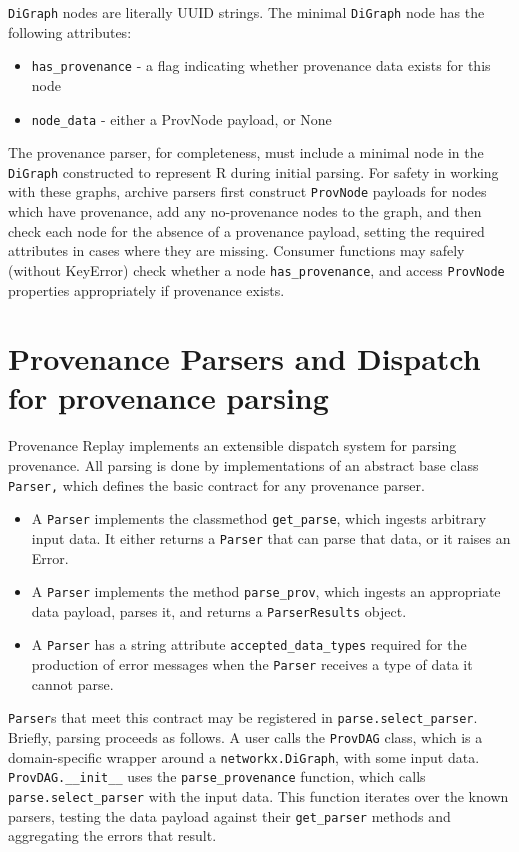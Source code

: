 \texttt{DiGraph} nodes are literally UUID strings. The minimal \texttt{DiGraph} node has the
following attributes:
\begin{itemize}
    \item \texttt{has\_provenance} - a flag indicating whether provenance data exists for this node
    \item \texttt{node\_data} - either a ProvNode payload, or None
\end{itemize}

The provenance parser, for completeness, must include a minimal node in the
\texttt{DiGraph} constructed to represent R during initial parsing. For safety in working
with these graphs, archive parsers first construct \texttt{ProvNode} payloads for nodes
which have provenance, add any no-provenance nodes to the graph, and then check
each node for the absence of a provenance payload, setting the required
attributes in cases where they are missing. Consumer functions may safely
(without KeyError) check whether a node \texttt{has\_provenance}, and access \texttt{ProvNode}
properties appropriately if provenance exists.

\section{Provenance Parsers and Dispatch for provenance parsing}

Provenance Replay implements an extensible dispatch system for parsing
provenance. All parsing is done by implementations of an abstract base class
\texttt{Parser,} which defines the basic contract for any provenance parser. 
\begin{itemize}
    \item A \texttt{Parser} implements the classmethod \texttt{get\_parse},
        which ingests arbitrary input data. It either returns a \texttt{Parser} that
        can parse that data, or it raises an Error.
    \item A \texttt{Parser} implements the method \texttt{parse\_prov}, which
        ingests an appropriate data payload, parses it, and returns a
        \texttt{ParserResults} object.
    \item A \texttt{Parser} has a string attribute
        \texttt{accepted\_data\_types} required for the production of error messages
        when the \texttt{Parser} receives a type of data it cannot parse.
\end{itemize}

\texttt{Parser}s that meet this contract may be registered in \texttt{parse.select\_parser}.
Briefly, parsing proceeds as follows. A user calls the \texttt{ProvDAG} class, which is a
domain-specific wrapper around a \texttt{networkx.DiGraph}, with some input data.
\texttt{ProvDAG.\_\_init\_\_} uses the \texttt{parse\_provenance} function, which calls
\texttt{parse.select\_parser} with the input data. This function iterates over the known
parsers, testing the data payload against their \texttt{get\_parser} methods and
aggregating the errors that result. 

